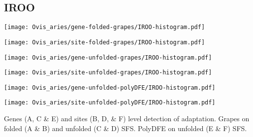 \documentclass{article}
\begin{document}
\subsection{IROO}
\centering
\begin{minipage}{0.49\linewidth}
    \texttt{[image: Ovis\_aries/gene-folded-grapes/IROO-histogram.pdf]}
\end{minipage}%
\hfill
\begin{minipage}{0.49\linewidth}
    \texttt{[image: Ovis\_aries/site-folded-grapes/IROO-histogram.pdf]}
\end{minipage}
\hfill
\begin{minipage}{0.49\linewidth}
    \texttt{[image: Ovis\_aries/gene-unfolded-grapes/IROO-histogram.pdf]}
\end{minipage}%
\hfill
\begin{minipage}{0.49\linewidth}
    \texttt{[image: Ovis\_aries/site-unfolded-grapes/IROO-histogram.pdf]}
\end{minipage}
\hfill
\begin{minipage}{0.49\linewidth}
    \texttt{[image: Ovis\_aries/gene-unfolded-polyDFE/IROO-histogram.pdf]}
\end{minipage}%
\hfill
\begin{minipage}{0.49\linewidth}
    \texttt{[image: Ovis\_aries/site-unfolded-polyDFE/IROO-histogram.pdf]}
\end{minipage}
\hfill
\flushleft
Genes (A, C \& E) and sites (B, D, \& F) level detection of adaptation.
Grapes on folded (A \& B) and unfolded (C \& D) SFS.
PolyDFE on unfolded (E \& F) SFS.

\pagebreak
\end{document}
